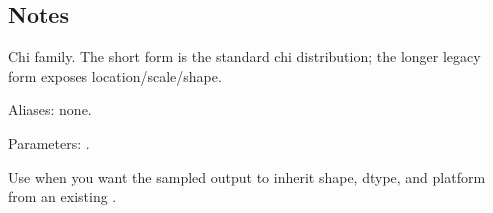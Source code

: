 \documentclass[letterpaper,10pt,english]{sphinxmanual}
\begin{document}
\begin{sphinxVerbatim}[commandchars=\\\{\}]
\end{sphinxVerbatim}


\subsection{Notes}
\label{\detokenize{distribution_catalog:id32}}
\sphinxAtStartPar
Chi family. The short form is the standard chi distribution; the longer legacy form exposes location/scale/shape.

\sphinxAtStartPar
Aliases: none.

\sphinxAtStartPar
Parameters: .

\sphinxAtStartPar
Use  when you want the sampled output to inherit shape, dtype, and platform from an existing .
\end{document}
